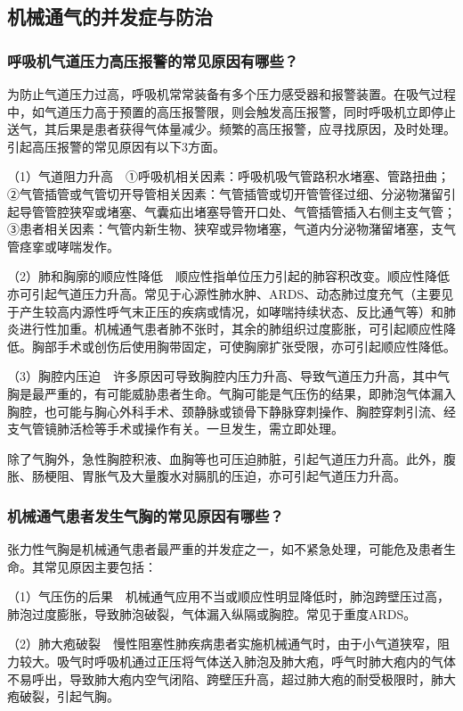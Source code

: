 \subsection{机械通气的并发症与防治}

\subsubsection{呼吸机气道压力高压报警的常见原因有哪些？}

为防止气道压力过高，呼吸机常常装备有多个压力感受器和报警装置。在吸气过程中，如气道压力高于预置的高压报警限，则会触发高压报警，同时呼吸机立即停止送气，其后果是患者获得气体量减少。频繁的高压报警，应寻找原因，及时处理。引起高压报警的常见原因有以下3方面。

（1）气道阻力升高　①呼吸机相关因素：呼吸机吸气管路积水堵塞、管路扭曲；②气管插管或气管切开导管相关因素：气管插管或切开管管径过细、分泌物潴留引起导管管腔狭窄或堵塞、气囊疝出堵塞导管开口处、气管插管插入右侧主支气管；③患者相关因素：气管内新生物、狭窄或异物堵塞，气道内分泌物潴留堵塞，支气管痉挛或哮喘发作。

（2）肺和胸廓的顺应性降低　顺应性指单位压力引起的肺容积改变。顺应性降低亦可引起气道压力升高。常见于心源性肺水肿、ARDS、动态肺过度充气（主要见于产生较高内源性呼气末正压的疾病或情况，如哮喘持续状态、反比通气等）和肺炎进行性加重。机械通气患者肺不张时，其余的肺组织过度膨胀，可引起顺应性降低。胸部手术或创伤后使用胸带固定，可使胸廓扩张受限，亦可引起顺应性降低。

（3）胸腔内压迫　许多原因可导致胸腔内压力升高、导致气道压力升高，其中气胸是最严重的，有可能威胁患者生命。气胸可能是气压伤的结果，即肺泡气体漏入胸腔，也可能与胸心外科手术、颈静脉或锁骨下静脉穿刺操作、胸腔穿刺引流、经支气管镜肺活检等手术或操作有关。一旦发生，需立即处理。

除了气胸外，急性胸腔积液、血胸等也可压迫肺脏，引起气道压力升高。此外，腹胀、肠梗阻、胃胀气及大量腹水对膈肌的压迫，亦可引起气道压力升高。

\subsubsection{机械通气患者发生气胸的常见原因有哪些？}

张力性气胸是机械通气患者最严重的并发症之一，如不紧急处理，可能危及患者生命。其常见原因主要包括：

（1）气压伤的后果　机械通气应用不当或顺应性明显降低时，肺泡跨壁压过高，肺泡过度膨胀，导致肺泡破裂，气体漏入纵隔或胸腔。常见于重度ARDS。

（2）肺大疱破裂　慢性阻塞性肺疾病患者实施机械通气时，由于小气道狭窄，阻力较大。吸气时呼吸机通过正压将气体送入肺泡及肺大疱，呼气时肺大疱内的气体不易呼出，导致肺大疱内空气闭陷、跨壁压升高，超过肺大疱的耐受极限时，肺大疱破裂，引起气胸。

